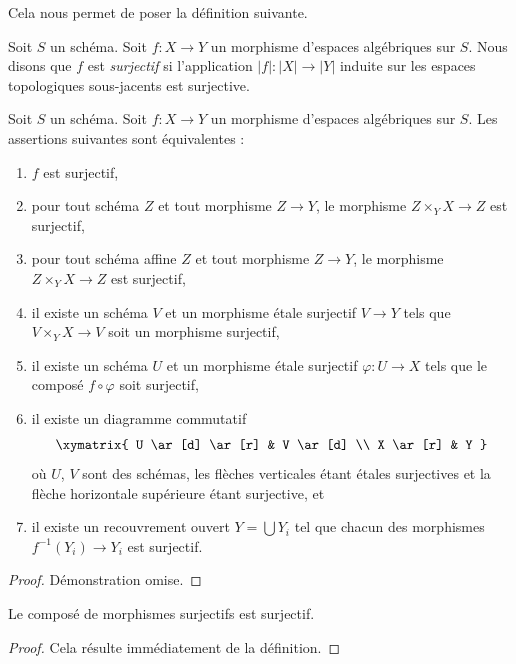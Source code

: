\noindent
Cela nous permet de poser la définition suivante.

\begin{definition}
\label{definition-surjective}
Soit $S$ un schéma. Soit $f : X \to Y$ un morphisme d'espaces
algébriques sur $S$. Nous disons que $f$ est {\it surjectif}
si l'application $|f| : |X| \to |Y|$ induite sur les espaces topologiques sous-jacents
est surjective.
\end{definition}

\begin{lemma}
\label{lemma-surjective-local}
Soit $S$ un schéma.
Soit $f : X \to Y$ un morphisme d'espaces algébriques sur $S$.
Les assertions suivantes sont équivalentes :
\begin{enumerate}
\item $f$ est surjectif,
\item pour tout schéma $Z$ et tout morphisme $Z \to Y$, le morphisme
$Z \times_Y X \to Z$ est surjectif,
\item pour tout schéma affine $Z$ et tout morphisme
$Z \to Y$, le morphisme $Z \times_Y X \to Z$ est surjectif,
\item il existe un schéma $V$ et un morphisme \'etale surjectif
$V \to Y$ tels que $V \times_Y X \to V$ soit un morphisme surjectif,
\item il existe un schéma $U$ et un morphisme \'etale surjectif
$\varphi : U \to X$ tels que le composé $f \circ \varphi$
soit surjectif,
\item il existe un diagramme commutatif
$$
\xymatrix{
U \ar[d] \ar[r] & V \ar[d] \\
X \ar[r] & Y
}
$$
où $U$, $V$ sont des schémas, les flèches verticales étant \'etales surjectives
et la flèche horizontale supérieure étant surjective, et
\item il existe un recouvrement ouvert $Y = \bigcup Y_i$ tel que
chacun des morphismes $f^{-1}(Y_i) \to Y_i$ est surjectif.
\end{enumerate}
\end{lemma}

\begin{proof}
Démonstration omise.
\end{proof}

\begin{lemma}
\label{lemma-composition-surjective}
Le composé de morphismes surjectifs est surjectif.
\end{lemma}

\begin{proof}
Cela résulte immédiatement de la définition.
\end{proof}

